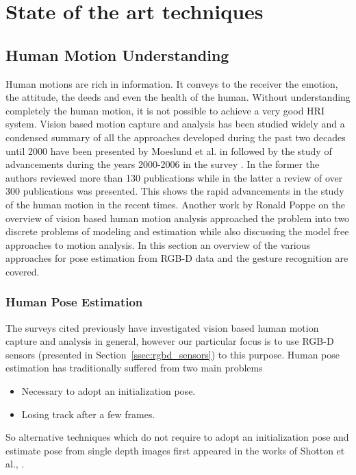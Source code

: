 \chapter{State of the art techniques}

\label{Chapter3} %


\section{Human Motion Understanding} %
 Human motions are rich in information. It conveys to the receiver the emotion, the attitude, the deeds and even the health of the human. Without understanding completely the human motion, it is not possible to achieve a very good HRI system.  Vision based motion capture and analysis has been studied widely and a condensed summary of all the approaches developed during the past two decades until 2000 have been presented by Moeslund et al. in \cite{Moeslund2001231} followed by the study of advancements during the years 2000-2006 in the survey \cite{Moeslund200690}. In the former the authors reviewed more than 130 publications while in the latter a review of over 300 publications was presented. This shows the rapid advancements in the study of the human motion in the recent times. Another work by Ronald Poppe \cite{Poppe20074} on the overview of vision based human motion analysis approached the problem into two discrete problems of modeling and estimation while also discussing the model free approaches to motion analysis. In this section an overview of the various approaches for pose estimation from RGB-D data and the gesture recognition are covered.
\subsection{Human Pose Estimation}
\label{sec:humanpose}
  The surveys \cite{Moeslund2001231}\cite{Moeslund200690}\cite{Poppe20074} cited previously have investigated vision based human motion capture and analysis in general, however our particular focus is to use RGB-D sensors (presented in Section~\ref{ssec:rgbd_sensors}) to this purpose. Human pose estimation has traditionally suffered from two main problems
\begin{itemize}
\item Necessary to adopt an initialization pose.
\item Losing track after a few frames.
\end{itemize}
So alternative techniques which do not require to adopt an initialization pose and estimate pose from single depth images first appeared in the works of Shotton et al., \cite{shotton2013real}.
